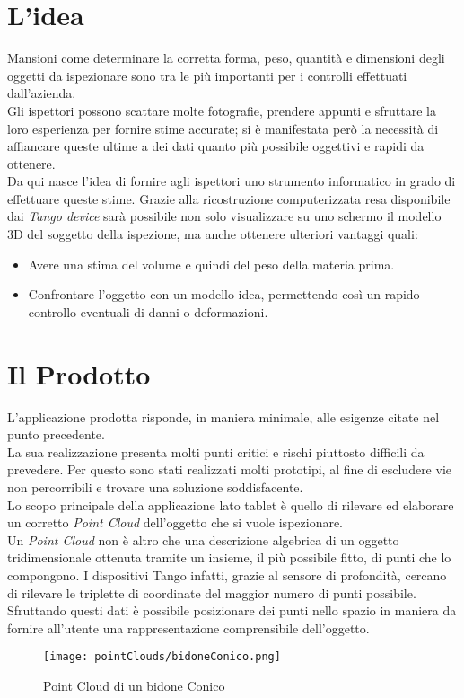 \section{L'idea}

Mansioni come determinare la corretta forma, peso, quantità e dimensioni degli oggetti da ispezionare sono tra le più importanti per i controlli effettuati dall'azienda.\\
Gli ispettori possono scattare molte fotografie, prendere appunti e sfruttare la loro esperienza per fornire stime accurate; si è manifestata però la necessità di affiancare queste ultime a dei dati quanto più possibile oggettivi e rapidi da ottenere.\\
Da qui nasce l'idea di fornire agli ispettori uno strumento informatico in grado di effettuare queste stime. Grazie alla ricostruzione computerizzata resa disponibile dai \emph{Tango device} sarà possibile non solo visualizzare su uno schermo il modello 3D del soggetto della ispezione, ma anche ottenere ulteriori vantaggi quali:
\begin{itemize}
	\item Avere una stima del volume e quindi del peso della materia prima.
	\item Confrontare l'oggetto con un modello idea, permettendo così un rapido controllo eventuali di danni o deformazioni.
\end{itemize}

\section{Il Prodotto}
L'applicazione prodotta risponde, in maniera minimale, alle esigenze citate nel punto precedente.\\
La sua realizzazione presenta molti punti critici e rischi piuttosto difficili da prevedere. Per questo sono stati realizzati molti prototipi, al fine di escludere vie non percorribili e trovare una soluzione soddisfacente.\\
Lo scopo principale della applicazione lato tablet è quello di rilevare ed elaborare un corretto \emph{Point Cloud} dell'oggetto che si vuole ispezionare.\\
Un \emph{Point Cloud} non è altro che una descrizione algebrica di un oggetto tridimensionale ottenuta tramite un insieme, il più possibile fitto, di punti che lo compongono. I dispositivi Tango infatti, grazie al sensore di profondità, cercano di rilevare le triplette di coordinate del maggior numero di punti possibile. Sfruttando questi dati è possibile posizionare dei punti nello spazio in maniera da fornire all'utente una rappresentazione comprensibile dell'oggetto.
\begin{figure}[!h] 
    \centering 
    \texttt{[image: pointClouds/bidoneConico.png]} 
    \caption{Point Cloud di un bidone Conico}
\end{figure}


